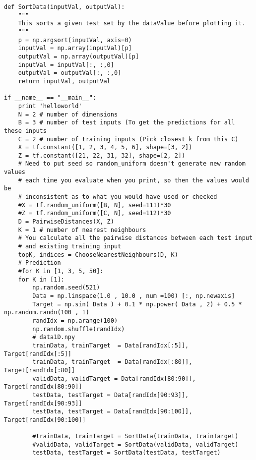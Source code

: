 \documentclass[a4paper,12pt]{article}
\begin{document}
\begin{verbatim}
def SortData(inputVal, outputVal):
    """
    This sorts a given test set by the dataValue before plotting it.
    """
    p = np.argsort(inputVal, axis=0)
    inputVal = np.array(inputVal)[p]
    outputVal = np.array(outputVal)[p]
    inputVal = inputVal[:, :,0]
    outputVal = outputVal[:, :,0]
    return inputVal, outputVal

if __name__ == "__main__":
    print 'helloworld'
    N = 2 # number of dimensions
    B = 3 # number of test inputs (To get the predictions for all these inputs
    C = 2 # number of training inputs (Pick closest k from this C)
    X = tf.constant([1, 2, 3, 4, 5, 6], shape=[3, 2])
    Z = tf.constant([21, 22, 31, 32], shape=[2, 2])
    # Need to put seed so random_uniform doesn't generate new random values
    # each time you evaluate when you print, so then the values would be 
    # inconsistent as to what you would have used or checked
    #X = tf.random_uniform([B, N], seed=111)*30
    #Z = tf.random_uniform([C, N], seed=112)*30
    D = PairwiseDistances(X, Z)
    K = 1 # number of nearest neighbours
    # You calculate all the pairwise distances between each test input
    # and existing training input
    topK, indices = ChooseNearestNeighbours(D, K)
    # Prediction
    #for K in [1, 3, 5, 50]:
    for K in [1]:
        np.random.seed(521)
        Data = np.linspace(1.0 , 10.0 , num =100) [:, np.newaxis]
        Target = np.sin( Data ) + 0.1 * np.power( Data , 2) + 0.5 * np.random.randn(100 , 1)
        randIdx = np.arange(100)
        np.random.shuffle(randIdx)
        # data1D.npy
        trainData, trainTarget  = Data[randIdx[:5]], Target[randIdx[:5]]
        trainData, trainTarget  = Data[randIdx[:80]], Target[randIdx[:80]]
        validData, validTarget = Data[randIdx[80:90]], Target[randIdx[80:90]]
        testData, testTarget = Data[randIdx[90:93]], Target[randIdx[90:93]]
        testData, testTarget = Data[randIdx[90:100]], Target[randIdx[90:100]]

        #trainData, trainTarget = SortData(trainData, trainTarget)
        #validData, validTarget = SortData(validData, validTarget)
        testData, testTarget = SortData(testData, testTarget)



\end{verbatim}
\end{document}
